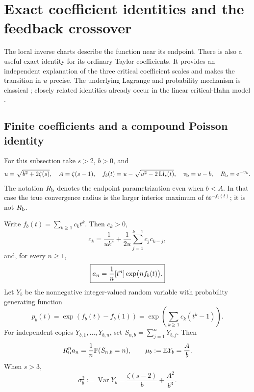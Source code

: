 \section{Exact coefficient identities and the feedback crossover}
\label{sec:coefficient-crossover}

The local inverse charts describe the function near its endpoint.
There is also a useful exact identity for its ordinary Taylor
coefficients.  It provides an independent explanation of the three
critical coefficient scales and makes the transition in $u$ precise.
The underlying Lagrange and probability mechanism is classical
\cite{Janson}; closely related identities already occur in the linear
critical-Hahn model \cite{RepoHahn}.

\subsection{Finite coefficients and a compound Poisson identity}

For this subsection take $s>2$, $b>0$, and
\[
 u=\sqrt{b^2+2\zeta(s)},\quad A=\zeta(s-1),\quad
 f_b(t)=u-\sqrt{u^2-2\operatorname{Li}_s(t)},\quad
 v_{\mathrm b}=u-b,\quad R_{\mathrm b}=\mathrm e^{-v_{\mathrm b}}.
\]
The notation $R_{\mathrm b}$ denotes the endpoint parametrization even when
$b<A$.  In that case the true convergence radius is the larger
interior maximum of $t\ee^{-f_b(t)}$; it is not $R_{\mathrm b}$.

\begin{proposition}
\label{prop:poisson}
Write $f_b(t)=\sum_{k\ge1}c_k t^k$.  Then $c_k>0$,
\begin{equation}\label{eq:finite-c}
 c_k=\frac1{u k^s}+\frac1{2u}\sum_{j=1}^{k-1}c_jc_{k-j},
\end{equation}
and, for every $n\ge1$,
\begin{equation}\label{eq:lagrange-exact}
 \boxed{\displaystyle
 a_n=\frac1n[t^{n}]\exp\bigl(n f_b(t)\bigr).}
\end{equation}
Let $Y_b$ be the nonnegative integer-valued random variable with
probability generating function
\begin{equation}\label{eq:pgf}
 p_b(t)=\exp(f_b(t)-f_b(1))
       =\exp\left(\sum_{k\ge1}c_k(t^k-1)\right).
\end{equation}
For independent copies $Y_{b,1},\ldots,Y_{b,n}$, set
$S_{n,b}=\sum_{j=1}^nY_{b,j}$.  Then
\begin{equation}\label{eq:poisson-exact}
 R_{\mathrm b}^n a_n=\frac1n\mathbb P(S_{n,b}=n),\qquad
 \mu_b:=\mathbb E Y_b=\frac A b.
\end{equation}
When $s>3$,
\begin{equation}\label{eq:variance}
 \sigma_b^2:=\operatorname{Var}Y_b
 =\frac{\zeta(s-2)}b+\frac{A^2}{b^3}.
\end{equation}
\end{proposition}

